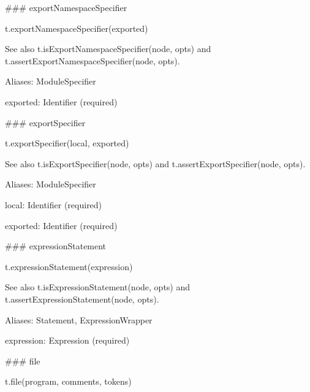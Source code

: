 \#\#\# export\+Namespace\+Specifier 
\begin{DoxyCode}
t.exportNamespaceSpecifier(exported)
\end{DoxyCode}


See also {\ttfamily t.\+is\+Export\+Namespace\+Specifier(node, opts)} and {\ttfamily t.\+assert\+Export\+Namespace\+Specifier(node, opts)}.

Aliases\+: {\ttfamily Module\+Specifier}


\begin{DoxyItemize}
\item {\ttfamily exported}\+: {\ttfamily Identifier} (required) 


\end{DoxyItemize}

\#\#\# export\+Specifier 
\begin{DoxyCode}
t.exportSpecifier(local, exported)
\end{DoxyCode}


See also {\ttfamily t.\+is\+Export\+Specifier(node, opts)} and {\ttfamily t.\+assert\+Export\+Specifier(node, opts)}.

Aliases\+: {\ttfamily Module\+Specifier}


\begin{DoxyItemize}
\item {\ttfamily local}\+: {\ttfamily Identifier} (required)
\item {\ttfamily exported}\+: {\ttfamily Identifier} (required) 


\end{DoxyItemize}

\#\#\# expression\+Statement 
\begin{DoxyCode}
t.expressionStatement(expression)
\end{DoxyCode}


See also {\ttfamily t.\+is\+Expression\+Statement(node, opts)} and {\ttfamily t.\+assert\+Expression\+Statement(node, opts)}.

Aliases\+: {\ttfamily Statement}, {\ttfamily Expression\+Wrapper}


\begin{DoxyItemize}
\item {\ttfamily expression}\+: {\ttfamily Expression} (required) 


\end{DoxyItemize}

\#\#\# file 
\begin{DoxyCode}
t.file(program, comments, tokens)
\end{DoxyCode}


